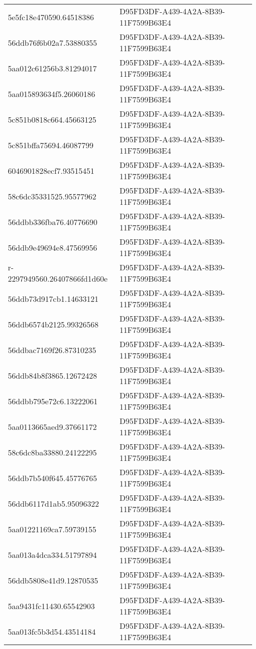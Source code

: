 \begin{tabular}{ll}
5e5fc18e470590.64518386 & D95FD3DF-A439-4A2A-8B39-11F7599B63E4 \\
56ddb76f6b02a7.53880355 & D95FD3DF-A439-4A2A-8B39-11F7599B63E4 \\
5aa012c61256b3.81294017 & D95FD3DF-A439-4A2A-8B39-11F7599B63E4 \\
5aa015893634f5.26060186 & D95FD3DF-A439-4A2A-8B39-11F7599B63E4 \\
5c851b0818c664.45663125 & D95FD3DF-A439-4A2A-8B39-11F7599B63E4 \\
5c851bffa75694.46087799 & D95FD3DF-A439-4A2A-8B39-11F7599B63E4 \\
6046901828ecf7.93515451 & D95FD3DF-A439-4A2A-8B39-11F7599B63E4 \\
58c6dc35331525.95577962 & D95FD3DF-A439-4A2A-8B39-11F7599B63E4 \\
56ddbb336fba76.40776690 & D95FD3DF-A439-4A2A-8B39-11F7599B63E4 \\
56ddb9e49694e8.47569956 & D95FD3DF-A439-4A2A-8B39-11F7599B63E4 \\
r-2297949560.26407866fd1d60e & D95FD3DF-A439-4A2A-8B39-11F7599B63E4 \\
56ddb73d917cb1.14633121 & D95FD3DF-A439-4A2A-8B39-11F7599B63E4 \\
56ddb6574b2125.99326568 & D95FD3DF-A439-4A2A-8B39-11F7599B63E4 \\
56ddbac7169f26.87310235 & D95FD3DF-A439-4A2A-8B39-11F7599B63E4 \\
56ddb84b8f3865.12672428 & D95FD3DF-A439-4A2A-8B39-11F7599B63E4 \\
56ddbb795e72c6.13222061 & D95FD3DF-A439-4A2A-8B39-11F7599B63E4 \\
5aa0113665aed9.37661172 & D95FD3DF-A439-4A2A-8B39-11F7599B63E4 \\
58c6dc8ba33880.24122295 & D95FD3DF-A439-4A2A-8B39-11F7599B63E4 \\
56ddb7b540f645.45776765 & D95FD3DF-A439-4A2A-8B39-11F7599B63E4 \\
56ddb6117d1ab5.95096322 & D95FD3DF-A439-4A2A-8B39-11F7599B63E4 \\
5aa01221169ca7.59739155 & D95FD3DF-A439-4A2A-8B39-11F7599B63E4 \\
5aa013a4dca334.51797894 & D95FD3DF-A439-4A2A-8B39-11F7599B63E4 \\
56ddb5808e41d9.12870535 & D95FD3DF-A439-4A2A-8B39-11F7599B63E4 \\
5aa9431fc11430.65542903 & D95FD3DF-A439-4A2A-8B39-11F7599B63E4 \\
5aa013fc5b3d54.43514184 & D95FD3DF-A439-4A2A-8B39-11F7599B63E4 \\

\end{tabular}
